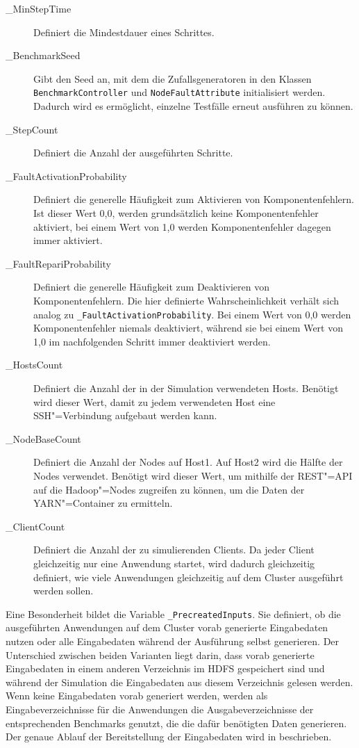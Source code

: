\begin{description}
    \item [\_MinStepTime]
        Definiert die Mindestdauer eines Schrittes.
    \item[\_BenchmarkSeed]
        Gibt den Seed an, mit dem die Zufallsgeneratoren in den Klassen \texttt{BenchmarkController} und \texttt{NodeFaultAttribute} initialisiert werden.
        Dadurch wird es ermöglicht, einzelne Testfälle erneut ausführen zu können.
    \item[\_StepCount]
        Definiert die Anzahl der ausgeführten Schritte.
    \item[\_FaultActivationProbability]
        Definiert die generelle Häufigkeit zum Aktivieren von Komponentenfehlern.
        Ist dieser Wert 0,0, werden grundsätzlich keine Komponentenfehler aktiviert, bei einem Wert von 1,0 werden Komponentenfehler dagegen immer aktiviert.
    \item[\_FaultRepariProbability]
        Definiert die generelle Häufigkeit zum Deaktivieren von Komponentenfehlern.
        Die hier definierte Wahrscheinlichkeit verhält sich analog zu \texttt{\_FaultActivationProbability}.
        Bei einem Wert von 0,0 werden Komponentenfehler niemals deaktiviert, während sie bei einem Wert von 1,0 im nachfolgenden Schritt immer deaktiviert werden.
    \item[\_HostsCount]
        Definiert die Anzahl der in der Simulation verwendeten Hosts.
        Benötigt wird dieser Wert, damit zu jedem verwendeten Host eine SSH"=Verbindung aufgebaut werden kann.
    \item[\_NodeBaseCount]
        Definiert die Anzahl der Nodes auf Host1.
        Auf Host2 wird die Hälfte der Nodes verwendet.
        Benötigt wird dieser Wert, um mithilfe der REST"=API auf die Hadoop"=Nodes zugreifen zu können, um die Daten der YARN"=Container zu ermitteln.
    \item[\_ClientCount]
        Definiert die Anzahl der zu simulierenden Clients.
        Da jeder Client gleichzeitig nur eine Anwendung startet, wird dadurch gleichzeitig definiert, wie viele Anwendungen gleichzeitig auf dem Cluster ausgeführt werden sollen.
\end{description}

Eine Besonderheit bildet die Variable \texttt{\_PrecreatedInputs}.
Sie definiert, ob die ausgeführten Anwendungen auf dem Cluster vorab generierte Eingabedaten nutzen oder alle Eingabedaten während der Ausführung selbst generieren.
Der Unterschied zwischen beiden Varianten liegt darin, dass vorab generierte Eingabedaten in einem anderen Verzeichnis im \ac{HDFS} gespeichert sind und während der Simulation die Eingabedaten aus diesem Verzeichnis gelesen werden.
Wenn keine Eingabedaten vorab generiert werden, werden als Eingabeverzeichnisse für die Anwendungen die Ausgabeverzeichnisse der entsprechenden Benchmarks genutzt, die die dafür benötigten Daten generieren.
Der genaue Ablauf der Bereitstellung der Eingabedaten wird in  beschrieben.

